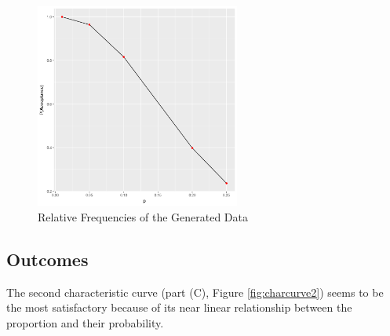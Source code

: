 \documentclass{article}
\begin{document}
            \begin{figure}[h]
                \begin{center}
                    \includegraphics[width=0.6\textwidth]{figures/charcurve3.png}
                    \caption{Relative Frequencies of the Generated Data} \label{fig:charcurve3}
                \end{center}
            \end{figure}

        \subsection{Outcomes}
            The second characteristic curve (part (C), Figure \ref{fig:charcurve2}) seems to be the most satisfactory because of its near linear relationship between the proportion and their probability.

    \newpage
\end{document}
